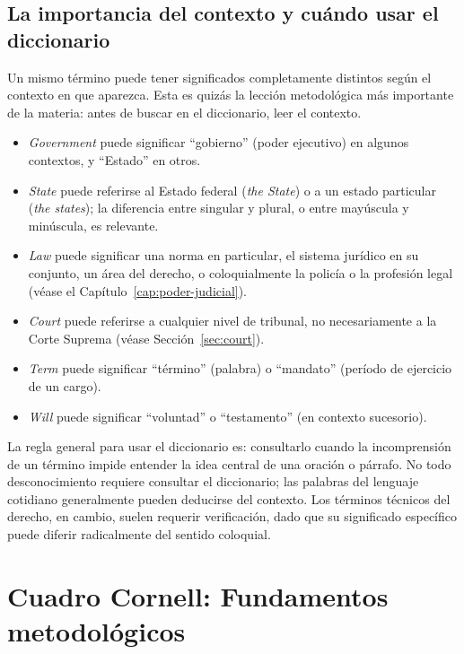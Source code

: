\documentclass[12pt,oneside]{book}
\begin{document}
\section{La importancia del contexto y cuándo usar el diccionario}

Un mismo término puede tener significados completamente distintos según el contexto en que aparezca. Esta es quizás la lección metodológica más importante de la materia: antes de buscar en el diccionario, leer el contexto.

\begin{itemize}
    \item \textit{Government} puede significar ``gobierno'' (poder ejecutivo) en algunos contextos, y ``Estado'' en otros.
    \item \textit{State} puede referirse al Estado federal (\textit{the State}) o a un estado particular (\textit{the states}); la diferencia entre singular y plural, o entre mayúscula y minúscula, es relevante.
    \item \textit{Law} puede significar una norma en particular, el sistema jurídico en su conjunto, un área del derecho, o coloquialmente la policía o la profesión legal (véase el Capítulo~\ref{cap:poder-judicial}).
    \item \textit{Court} puede referirse a cualquier nivel de tribunal, no necesariamente a la Corte Suprema (véase Sección~\ref{sec:court}).
    \item \textit{Term} puede significar ``término'' (palabra) o ``mandato'' (período de ejercicio de un cargo).
    \item \textit{Will} puede significar ``voluntad'' o ``testamento'' (en contexto sucesorio).
\end{itemize}

La regla general para usar el diccionario es: consultarlo cuando la incomprensión de un término impide entender la idea central de una oración o párrafo. No todo desconocimiento requiere consultar el diccionario; las palabras del lenguaje cotidiano generalmente pueden deducirse del contexto. Los términos técnicos del derecho, en cambio, suelen requerir verificación, dado que su significado específico puede diferir radicalmente del sentido coloquial.

\chapter*{Cuadro Cornell: Fundamentos metodológicos}
\end{document}
